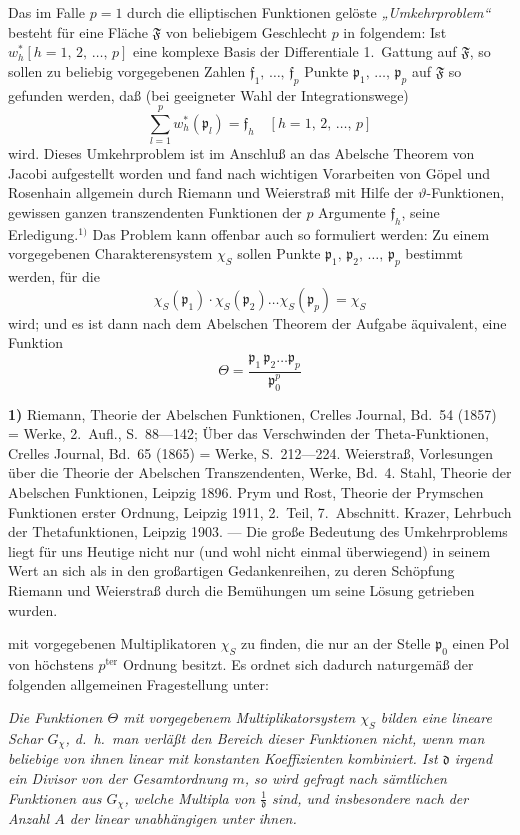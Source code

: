 \documentclass{article}
\begin{document}
Das im Falle $p = 1$ durch die elliptischen Funktionen gelöste \emph{„Umkehrproblem“} besteht für eine Fläche $\mathfrak{F}$ von beliebigem Geschlecht $p$ in folgendem: Ist $w_h^* [h = 1, \, 2, \, \dots, \, p]$ eine komplexe Basis der Differentiale 1.\ Gattung auf $\mathfrak{F}$, so sollen zu beliebig vorgegebenen Zahlen $\mathfrak{f}_1, \, \dots, \, \mathfrak{f}_p$ Punkte $\mathfrak{p}_1, \, \dots, \, \mathfrak{p}_p$ auf $\mathfrak{F}$ so gefunden werden, daß (bei geeigneter Wahl der Integrationswege)
\[ \sum_{l=1}^p w_h^*(\mathfrak{p}_l) = \mathfrak{f}_h \quad [h = 1, \, 2, \, \dots, \, p] \tag{45} \]
wird. Dieses Umkehrproblem ist im Anschluß an das Abelsche Theorem von Jacobi aufgestellt worden und fand nach wichtigen Vorarbeiten von Göpel und Rosenhain allgemein durch Riemann und Weierstraß mit Hilfe der $\vartheta$-Funktionen, gewissen ganzen transzendenten Funktionen der $p$ Argumente $\mathfrak{f}_h$, seine Erledigung.${}^{1)}$ Das Problem kann offenbar auch so formuliert werden: Zu einem vorgegebenen Charakterensystem $\chi_S$ sollen Punkte $\mathfrak{p}_1, \, \mathfrak{p}_2, \, \dots, \, \mathfrak{p}_p$ bestimmt werden, für die
\[ \chi_S(\mathfrak{p}_1) \cdot \chi_S(\mathfrak{p}_2) \dots \chi_S(\mathfrak{p}_p) = \chi_S \tag{46} \]
wird; und es ist dann nach dem Abelschen Theorem der Aufgabe äquivalent, eine Funktion
\[ \Theta = \frac{\mathfrak{p}_1 \, \mathfrak{p}_2 \dots \mathfrak{p}_p}{\mathfrak{p}_0^p} \]

\textbf{1)} Riemann, Theorie der Abelschen Funktionen, Crelles Journal, Bd.~54 (1857) = Werke, 2.~Aufl., S.~88---142; Über das Verschwinden der Theta-Funktionen, Crelles Journal, Bd.~65 (1865) = Werke, S.~212---224. Weierstraß, Vorlesungen über die Theorie der Abelschen Transzendenten, Werke, Bd.~4. Stahl, Theorie der Abelschen Funktionen, Leipzig 1896. Prym und Rost, Theorie der Prymschen Funktionen erster Ordnung, Leipzig 1911, 2.~Teil, 7.~Abschnitt. Krazer, Lehrbuch der Thetafunktionen, Leipzig 1903. --- Die große Bedeutung des Umkehrproblems liegt für uns Heutige nicht nur (und wohl nicht einmal überwiegend) in seinem Wert an sich als in den großartigen Gedankenreihen, zu deren Schöpfung Riemann und Weierstraß durch die Bemühungen um seine Lösung getrieben wurden.

mit vorgegebenen Multiplikatoren $\chi_S$ zu finden, die nur an der Stelle $\mathfrak{p}_0$ einen Pol von höchstens $p^{\text{ter}}$ Ordnung besitzt. Es ordnet sich dadurch naturgemäß der folgenden allgemeinen Fragestellung unter:

\emph{Die Funktionen $\Theta$ mit vorgegebenem Multiplikatorsystem $\chi_S$ bilden eine lineare Schar $G_\chi$, d.~h.\ man verläßt den Bereich dieser Funktionen nicht, wenn man beliebige von ihnen linear mit konstanten Koeffizienten kombiniert. Ist $\mathfrak{d}$ irgend ein Divisor von der Gesamtordnung $m$, so wird gefragt nach sämtlichen Funktionen aus $G_\chi$, welche Multipla von $\frac{1}{\mathfrak{d}}$ sind, und insbesondere nach der Anzahl $A$ der linear unabhängigen unter ihnen.}
\end{document}
